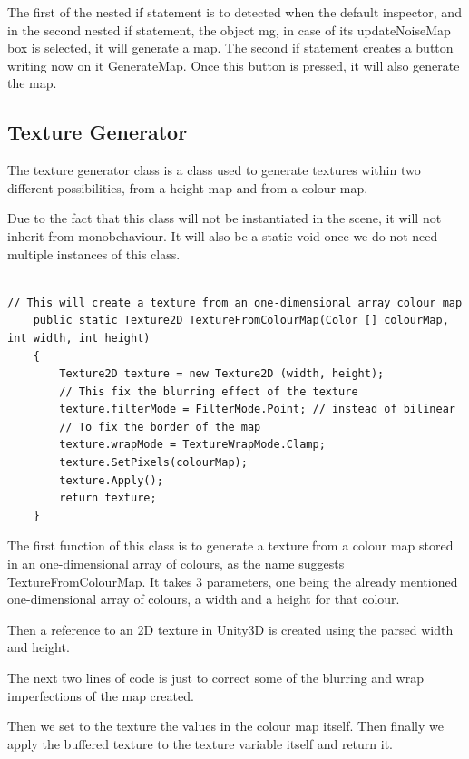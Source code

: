\documentclass[a4paper,12pt]{book}
\begin{document}
The first of the nested if statement is to detected when the default inspector, and in the second nested if statement, the object mg, in case of its updateNoiseMap box is selected, it will generate a map.
The second if statement creates a button writing now on it GenerateMap. Once this button is pressed, it will also generate the map. 


\subsection{Texture Generator}

The texture generator class is a class used to generate textures within two different possibilities, from a height map and from a colour map.

Due to the fact that this class will not be instantiated in the scene, it will not inherit from monobehaviour. It will also be a static void once we do not need multiple instances of this class.

\begin{lstlisting}

// This will create a texture from an one-dimensional array colour map
    public static Texture2D TextureFromColourMap(Color [] colourMap, int width, int height)
    {
        Texture2D texture = new Texture2D (width, height);
        // This fix the blurring effect of the texture
        texture.filterMode = FilterMode.Point; // instead of bilinear
        // To fix the border of the map
        texture.wrapMode = TextureWrapMode.Clamp;
        texture.SetPixels(colourMap);
        texture.Apply();
        return texture;
    }

\end{lstlisting}

The first function of this class is to generate a texture from a colour map stored in an one-dimensional array of colours, as the name suggests TextureFromColourMap.
It takes 3 parameters, one being the already mentioned one-dimensional array of colours, a width and a height for that colour.

Then a reference to an 2D texture in Unity3D is created using the parsed width and height.

The next two lines of code is just to correct some of the blurring and wrap imperfections of the map created.

Then we set to the texture the values in the colour map itself. Then finally we apply the buffered texture to the texture variable itself and return it.
\end{document}
